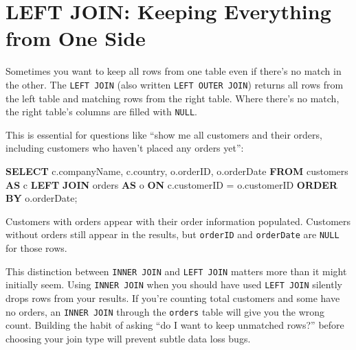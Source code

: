 \documentclass[
  letterpaper,
  DIV=11,
  numbers=noendperiod]{scrreprt}
\newenvironment{Shaded}{\begin{snugshade}}{\end{snugshade}}
\newcommand{\KeywordTok}[1]{\textcolor[rgb]{0.00,0.23,0.31}{\textbf{#1}}}
\newcommand{\NormalTok}[1]{\textcolor[rgb]{0.00,0.23,0.31}{#1}}
\newcommand{\OperatorTok}[1]{\textcolor[rgb]{0.37,0.37,0.37}{#1}}
\begin{document}
\section{LEFT JOIN: Keeping Everything from One
Side}\label{left-join-keeping-everything-from-one-side}

Sometimes you want to keep all rows from one table even if there's no
match in the other. The \texttt{LEFT\ JOIN} (also written
\texttt{LEFT\ OUTER\ JOIN}) returns all rows from the left table and
matching rows from the right table. Where there's no match, the right
table's columns are filled with \texttt{NULL}.

This is essential for questions like ``show me all customers and their
orders, including customers who haven't placed any orders yet'':

\begin{codelisting}

\caption{\texttt{duckdb}}

\begin{Shaded}
\begin{Highlighting}[]
\KeywordTok{SELECT}
\NormalTok{    c.companyName,}
\NormalTok{    c.country,}
\NormalTok{    o.orderID,}
\NormalTok{    o.orderDate}
\KeywordTok{FROM}\NormalTok{ customers }\KeywordTok{AS}\NormalTok{ c}
\KeywordTok{LEFT} \KeywordTok{JOIN}\NormalTok{ orders }\KeywordTok{AS}\NormalTok{ o}
    \KeywordTok{ON}\NormalTok{ c.customerID }\OperatorTok{=}\NormalTok{ o.customerID}
\KeywordTok{ORDER} \KeywordTok{BY}\NormalTok{ o.orderDate;}
\end{Highlighting}
\end{Shaded}

\end{codelisting}

Customers with orders appear with their order information populated.
Customers without orders still appear in the results, but
\texttt{orderID} and \texttt{orderDate} are \texttt{NULL} for those
rows.

This distinction between \texttt{INNER\ JOIN} and \texttt{LEFT\ JOIN}
matters more than it might initially seem. Using \texttt{INNER\ JOIN}
when you should have used \texttt{LEFT\ JOIN} silently drops rows from
your results. If you're counting total customers and some have no
orders, an \texttt{INNER\ JOIN} through the \texttt{orders} table will
give you the wrong count. Building the habit of asking ``do I want to
keep unmatched rows?'' before choosing your join type will prevent
subtle data loss bugs.
\end{document}
